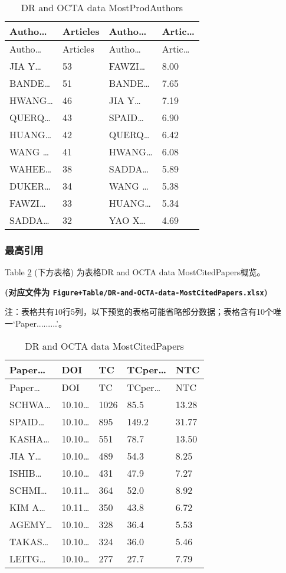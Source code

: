 \documentclass[
]{article}
\begin{document}
\begin{longtable}[]{@{}llll@{}}
\caption{\label{tab:DR-and-OCTA-data-MostProdAuthors}DR and OCTA data MostProdAuthors}\tabularnewline
\toprule
Autho\ldots{} & Articles & Autho\ldots{} & Artic\ldots{}\tabularnewline
\midrule
\endfirsthead
\toprule
Autho\ldots{} & Articles & Autho\ldots{} & Artic\ldots{}\tabularnewline
\midrule
\endhead
JIA Y\ldots{} & 53 & FAWZI\ldots{} & 8.00\tabularnewline
BANDE\ldots{} & 51 & BANDE\ldots{} & 7.65\tabularnewline
HWANG\ldots{} & 46 & JIA Y\ldots{} & 7.19\tabularnewline
QUERQ\ldots{} & 43 & SPAID\ldots{} & 6.90\tabularnewline
HUANG\ldots{} & 42 & QUERQ\ldots{} & 6.42\tabularnewline
WANG \ldots{} & 41 & HWANG\ldots{} & 6.08\tabularnewline
WAHEE\ldots{} & 38 & SADDA\ldots{} & 5.89\tabularnewline
DUKER\ldots{} & 34 & WANG \ldots{} & 5.38\tabularnewline
FAWZI\ldots{} & 33 & HUANG\ldots{} & 5.34\tabularnewline
SADDA\ldots{} & 32 & YAO X\ldots{} & 4.69\tabularnewline
\bottomrule
\end{longtable}

\hypertarget{ux6700ux9ad8ux5f15ux7528}{%
\subsubsection{最高引用}\label{ux6700ux9ad8ux5f15ux7528}}

Table \ref{tab:DR-and-OCTA-data-MostCitedPapers} (下方表格) 为表格DR and OCTA data MostCitedPapers概览。

\textbf{(对应文件为 \texttt{Figure+Table/DR-and-OCTA-data-MostCitedPapers.xlsx})}

\begin{center}\begin{tcolorbox}[colback=gray!10, colframe=gray!50, width=0.9\linewidth, arc=1mm, boxrule=0.5pt]注：表格共有10行5列，以下预览的表格可能省略部分数据；表格含有10个唯一`Paper.........'。
\end{tcolorbox}
\end{center}

\begin{longtable}[]{@{}lllll@{}}
\caption{\label{tab:DR-and-OCTA-data-MostCitedPapers}DR and OCTA data MostCitedPapers}\tabularnewline
\toprule
Paper\ldots{} & DOI & TC & TCper\ldots{} & NTC\tabularnewline
\midrule
\endfirsthead
\toprule
Paper\ldots{} & DOI & TC & TCper\ldots{} & NTC\tabularnewline
\midrule
\endhead
SCHWA\ldots{} & 10.10\ldots{} & 1026 & 85.5 & 13.28\tabularnewline
SPAID\ldots{} & 10.10\ldots{} & 895 & 149.2 & 31.77\tabularnewline
KASHA\ldots{} & 10.10\ldots{} & 551 & 78.7 & 13.50\tabularnewline
JIA Y\ldots{} & 10.10\ldots{} & 489 & 54.3 & 8.25\tabularnewline
ISHIB\ldots{} & 10.10\ldots{} & 431 & 47.9 & 7.27\tabularnewline
SCHMI\ldots{} & 10.11\ldots{} & 364 & 52.0 & 8.92\tabularnewline
KIM A\ldots{} & 10.11\ldots{} & 350 & 43.8 & 6.72\tabularnewline
AGEMY\ldots{} & 10.10\ldots{} & 328 & 36.4 & 5.53\tabularnewline
TAKAS\ldots{} & 10.10\ldots{} & 324 & 36.0 & 5.46\tabularnewline
LEITG\ldots{} & 10.10\ldots{} & 277 & 27.7 & 7.79\tabularnewline
\bottomrule
\end{longtable}
\end{document}
